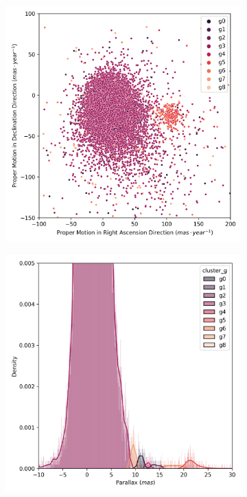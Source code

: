 \documentclass[11pt,a4paper,english,twocolumn]{article}
\begin{document}
\begin{figure}[!hbt]
  \centering
  \begin{subfigure}[t]{0.30\textwidth}
    \centering
    \includegraphics[width=\textwidth]{../figures/melotte_25/dec_pm_melotte_25.png}
  \end{subfigure}
  \hfill
  \begin{subfigure}[t]{0.30\textwidth}
    \centering
    \includegraphics[width=\textwidth]{../figures/melotte_25/dec_parallax_melotte_25.png}

\end{subfigure}
\end{figure}
\end{document}
